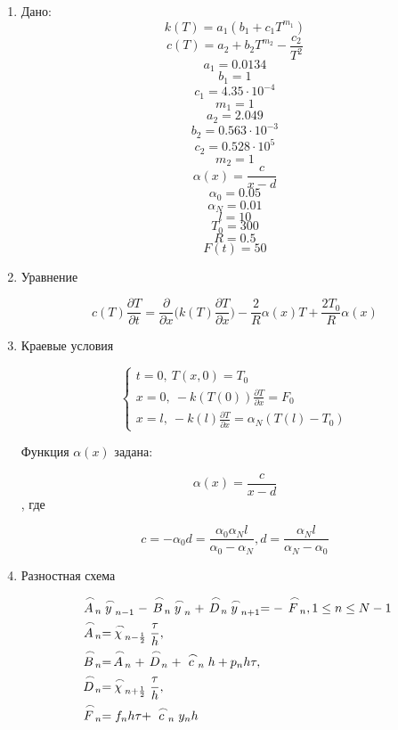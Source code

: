 \documentclass[a4paper,14pt]{extreport} %
\begin{document}
\begin{enumerate}
\item Дано:
$$k(T)=a_1(b_1+c_1T^{m_1})$$
$$c(T)=a_2+b_2T^{m_2}-\frac{c_2}{T^2}$$
$$a_1=0.0134$$
$$b_1=1$$
$$c_1=4.35\cdot10^{-4}$$
$$m_1=1$$
$$a_2=2.049$$
$$b_2=0.563\cdot10^{-3}$$
$$c_2=0.528\cdot10^{5}$$
$$m_2=1$$
$$\alpha(x)=\frac{c}{x-d}$$
$$\alpha_0=0.05$$
$$\alpha_N=0.01$$
$$l=10$$
$$T_0=300$$
$$R=0.5$$
$$F(t)=50$$

\item Уравнение

\begin{equation}
c(T)\frac{\partial T}{\partial t}=\frac{\partial}{\partial x}\bigg(k(T)\frac{\partial T}{\partial x}\bigg)-\frac{2}{R}\alpha(x)T+\frac{2T_0}{R}\alpha(x)
\end{equation}

\item Краевые условия

$$
 \begin{cases}
 t=0, ~T(x,0)=T_0
   \\
   x=0, ~-k(T(0))\frac{\partial T}{\partial x}=F_0
   \\
   x =l,~-k(l)\frac{\partial T}{\partial x}=\alpha_N(T(l)-T_0)
 \end{cases}
$$

Функция $\alpha(x)$ задана:

$$\alpha(x)=\frac{c}{x-d}$$, где 

$$c=-\alpha_0d=\frac{\alpha_0\alpha_Nl}{\alpha_0-\alpha_N}, d = \frac{\alpha_Nl}{\alpha_N-\alpha_0}$$

\item Разностная схема

\begin{equation}
\begin{aligned}
&\buildrel\,\,\frown\over{A}_n\buildrel\,\,\frown\over{y}_{n-1}-\buildrel\,\,\frown\over{B}_n\buildrel\,\,\frown\over{y}_n+\buildrel\,\,\frown\over{D}_n\buildrel\,\,\frown\over{y}_{n+1}=-\buildrel\,\,\frown\over{F}_n, 1\le n\le N-1\\
&\buildrel\,\,\frown\over{A}_n=\buildrel\,\,\frown\over{\chi}_{n-\frac{1}{2}}\frac{\tau}{h},\\
&\buildrel\,\,\frown\over{B}_n=\buildrel\,\,\frown\over{A}_n+\buildrel\,\,\frown\over{D}_n+\buildrel\,\,\frown\over{c}_nh+p_nh\tau,\\
& \buildrel\,\,\frown\over{D}_n=\buildrel\,\,\frown\over{\chi}_{n+\frac{1}{2}}\frac{\tau}{h}, \\
&\buildrel\,\,\frown\over{F}_n=f_nh\tau+\buildrel\,\,\frown\over{c}_ny_nh\\
\end{aligned}
\end{equation}


\end{enumerate}
\end{document}
